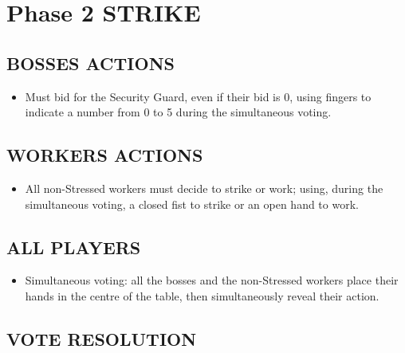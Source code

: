 \section{Phase 2 STRIKE}

    \subsection{BOSSES ACTIONS}
    
        \begin{itemize}
            \item Must bid for the Security Guard, even if their bid is 0, using fingers to
            indicate a number from 0 to 5 during the simultaneous voting.
        \end{itemize}
        
    \subsection{WORKERS ACTIONS}
    
        \begin{itemize}
            \item All non-Stressed workers must decide to strike or work; using, during the
            simultaneous voting, a closed fist to strike or an open hand to work.
        \end{itemize}
    
    \subsection{ALL PLAYERS}

        \begin{itemize}
            \item Simultaneous voting: all the bosses and the non-Stressed workers place
            their hands in the centre of the table, then simultaneously reveal their action.
        \end{itemize}
    
    \subsection{VOTE RESOLUTION}

